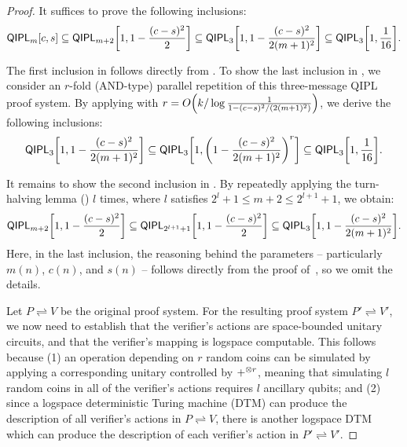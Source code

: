 \documentclass[11pt, a4paper]{article}
\numberwithin{equation}{section}
\numberwithin{figure}{section}
\newcommand{\QIPL}{\textnormal{\textsf{QIPL}}\xspace}
\newcommand{\protocol}[2]{{#1}\!\rightleftharpoons\!{#2}}
\DeclarePairedDelimiter\rbra{\lparen}{\rparen}
\DeclarePairedDelimiter\sbra{\lbrack}{\rbrack}
\let\ket\relax\DeclarePairedDelimiter\ket{\lvert}{\rangle}
\begin{document}
\begin{proof}
    It suffices to prove the following inclusions: 
    \begin{equation}
        \label{eq:QIPLconst-in-QIPL3}
        \QIPL_m[c,s] \subseteq \QIPL_{m+2}\sbra*{1,1-\frac{(c-s)^2}{2}} \subseteq \QIPL_{3}\sbra*{1,1-\frac{(c-s)^2}{2(m+1)^2}} \subseteq \QIPL_{3}\sbra*{1,\frac{1}{16}}.
    \end{equation}

    The first inclusion in  follows directly from . 
    To show the last inclusion in , we consider an $r$-fold (AND-type) parallel repetition of this three-message \QIPL{} proof system. 
    By applying  with $r = O\rbra*{k/\log\frac{1}{1-(c-s)^2/(2(m+1)^2)}}$, we derive the following inclusions:
    \[\QIPL_{3}\sbra*{1,1-\frac{(c-s)^2}{2(m+1)^2}} \subseteq \QIPL_{3}\sbra*{1,\rbra*{1-\frac{(c-s)^2}{2(m+1)^2}}^r} \subseteq \QIPL_{3}\sbra*{1,\frac{1}{16}}.\]

    It remains to show the second inclusion in . 
    By repeatedly applying the turn-halving lemma () $l$ times, where $l$ satisfies $2^l + 1 \leq m+2 \leq 2^{l+1}+1$, we obtain:
    \begin{equation}
        \label{eq:QIPLm-in-QIPL3}
        \QIPL_{m+2} \sbra*{1,1-\frac{(c-s)^2}{2}} \subseteq \QIPL_{2^{l+1}+1} \sbra*{1,1-\frac{(c-s)^2}{2}} \subseteq \QIPL_{3}\sbra*{1,1-\frac{(c-s)^2}{2(m+1)^2}}.
    \end{equation}
    Here, in the last inclusion, the reasoning behind the parameters -- particularly $m(n)$, $c(n)$, and $s(n)$ -- follows directly from the proof of~\cite[Lemma 4.2]{KKMV09}, so we omit the details. 

    Let $\protocol{P}{V}$ be the original proof system. For the resulting proof system $\protocol{P'}{V'}$, we now need to establish that the verifier's actions are space-bounded unitary circuits, and that the verifier's mapping is logspace computable. 
    This follows because (1) an operation depending on $r$ random coins can be simulated by applying a corresponding unitary controlled by $\ket{+}^{\otimes r}$, meaning that simulating $l$ random coins in all of the verifier's actions requires $l$ ancillary qubits; and (2) since a logspace deterministic Turing machine (DTM) can produce the description of all verifier's actions in $\protocol{P}{V}$, there is another logspace DTM which can produce the description of each verifier's action in $\protocol{P'}{V'}$. 
\end{proof}
\end{document}

